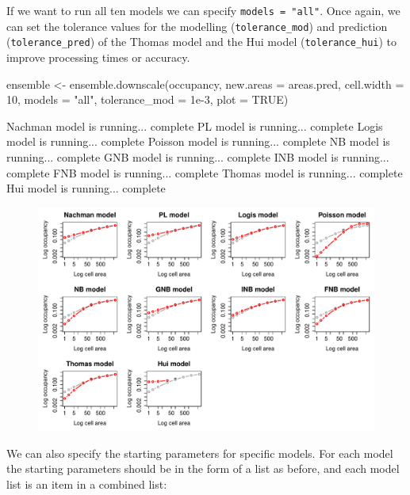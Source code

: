 \documentclass{article}[12pt, a4paper]
\begin{document}
\newpage
If we want to run all ten models we can specify \texttt{models = "all"}. Once again, we can set the tolerance values for the modelling (\texttt{tolerance\_mod}) and prediction (\texttt{tolerance\_pred}) of the Thomas model and the Hui model (\texttt{tolerance\_hui}) to improve processing times or accuracy.

\begin{Schunk}
\begin{Sinput}
ensemble <- ensemble.downscale(occupancy,
                               new.areas = areas.pred,
                               cell.width = 10,
                               models = "all",
                               tolerance_mod = 1e-3,
                               plot = TRUE)
\end{Sinput}
\begin{Soutput}
Nachman model is running...  complete 
PL model is running...  complete 
Logis model is running...  complete 
Poisson model is running...  complete 
NB model is running...  complete 
GNB model is running...  complete 
INB model is running...  complete 
FNB model is running...  complete 
Thomas model is running...  complete 
Hui model is running...  complete 
\end{Soutput}
\end{Schunk}

\begin{figure}[!ht]
\centering
\includegraphics[width=\linewidth]{Downscaling-downscale24}
\end{figure}

We can also specify the starting parameters for specific models. For each model the starting parameters should be in the form of a list as before, and each model list is an item in a combined list:
\end{document}
